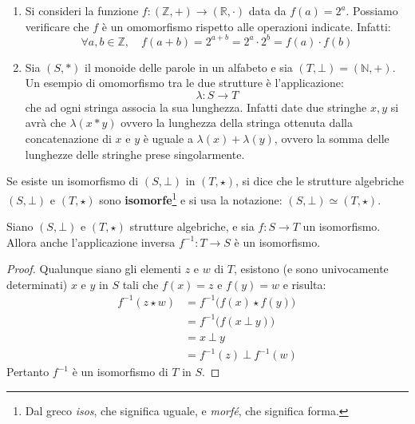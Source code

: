 \begin{example}
\begin{enumerate}
	\item Si consideri la funzione $f: (\mathbb{Z},+) \rightarrow (\mathbb{R}, \cdot)$ data da $f(a)=2^{a}$. Possiamo verificare che $f$ è un omomorfismo rispetto alle operazioni indicate. Infatti:
	\begin{displaymath}
		\forall a,b \in \mathbb{Z}, \quad f(a+b)=2^{a+b}=2^{a}\cdot 2^{b}=f(a) \cdot f(b)
	\end{displaymath}

	\item Sia $(S, \ast)$ il monoide delle parole in un alfabeto e sia $(T, \bot) = (\mathbb{N}, +)$. Un esempio di omomorfismo tra le due strutture è l'applicazione:
	\begin{displaymath}
		\lambda: S \rightarrow T
	\end{displaymath}
	che ad ogni stringa associa la sua lunghezza. Infatti date due stringhe $x,y$ si avrà che $\lambda(x \ast y)$ ovvero la lunghezza della stringa ottenuta dalla concatenazione di $x$ e $y$ è uguale a $\lambda(x)+\lambda(y)$, ovvero la somma delle lunghezze delle stringhe prese singolarmente.
\end{enumerate}
\end{example}


\begin{osservation}
	Se esiste un isomorfismo di $(S,\bot)$ in $(T,\star)$, si dice che le strutture algebriche $(S,\bot)$ e $(T,\star)$ sono \textbf{isomorfe}\footnote{Dal greco \textit{isos}, che significa uguale, e \textit{morfé}, che significa forma.} e si usa la notazione: $(S,\bot) \simeq (T,\star)$.
\end{osservation}

\begin{propbox}
	Siano $(S, \bot)$ e $(T,\star)$ strutture algebriche, e sia $f:S \rightarrow T$ un isomorfismo. Allora anche l'applicazione inversa $f^{-1}: T \rightarrow S$ è un isomorfismo.
\end{propbox}

\begin{proof}
	Qualunque siano gli elementi $z$ e $w$ di $T$, esistono (e sono univocamente determinati) $x$ e $y$ in $S$ tali che $f(x)=z$ e $f(y)=w$ e risulta:
	\begin{align*}
		f^{-1}(z \star w) &= f^{-1}\bigl(f(x) \star f(y) \bigr) \\
		&= f^{-1} \bigl(f(x \ \bot \ y) \bigr)\\
		&= x \ \bot \ y \\
		&= f^{-1}(z) \ \bot  \ f^{-1}(w)
	\end{align*}
	Pertanto $f^{-1}$ è un isomorfismo di $T$ in $S$.
\end{proof}

